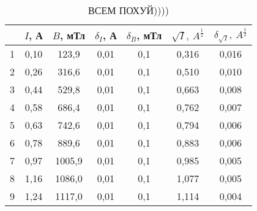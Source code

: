 \begin{table}
\centering
\caption{ВСЕМ ПОХУЙ))))}
\begin{tabular}{|c|c|c|c|c|c|c|}
\hline
 & $I$, А & $B$, мТл & $\delta_I$, А & $\delta_B$, мТл & $\sqrt{I},\ A^{\frac{1}{2}}$ & $\delta_{\sqrt{I}},\ A^{\frac{1}{2}}$ \\
\hline
1 & 0,10 & 123,9 & 0,01 & 0,1 & 0,316 & 0,016 \\
\cline{1-7}
2 & 0,26 & 316,6 & 0,01 & 0,1 & 0,510 & 0,010 \\
\cline{1-7}
3 & 0,44 & 529,8 & 0,01 & 0,1 & 0,663 & 0,008 \\
\cline{1-7}
4 & 0,58 & 686,4 & 0,01 & 0,1 & 0,762 & 0,007 \\
\cline{1-7}
5 & 0,63 & 742,6 & 0,01 & 0,1 & 0,794 & 0,006 \\
\cline{1-7}
6 & 0,78 & 889,6 & 0,01 & 0,1 & 0,883 & 0,006 \\
\cline{1-7}
7 & 0,97 & 1005,9 & 0,01 & 0,1 & 0,985 & 0,005 \\
\cline{1-7}
8 & 1,16 & 1086,0 & 0,01 & 0,1 & 1,077 & 0,005 \\
\cline{1-7}
9 & 1,24 & 1117,0 & 0,01 & 0,1 & 1,114 & 0,004 \\
\cline{1-7}
\hline
\end{tabular}
\end{table}

